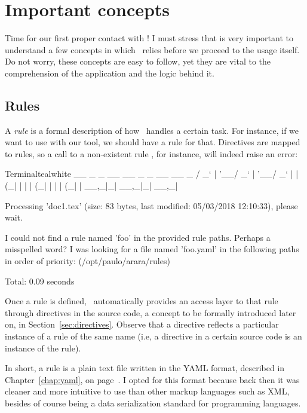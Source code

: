 \chapter{Important concepts}
\label{chap:importantconcepts}

Time for our first proper contact with \arara! I must stress that is very important to understand a few concepts in which \arara\ relies before we proceed to the usage itself. Do not worry, these concepts are easy to follow, yet they are vital to the comprehension of the application and the logic behind it.

\section{Rules}
\label{sec:rule}

A \emph{rule} is a formal description of how \arara\ handles a certain task. For instance, if we want to use  with our tool, we should have a rule for that. Directives are mapped to rules, so a call to a non-existent rule , for instance, will indeed raise an error:

\begin{codebox}{Terminal}{teal}{\icnote}{white}
  __ _ _ __ __ _ _ __ __ _ 
 / _` | '__/ _` | '__/ _` |
| (_| | | | (_| | | | (_| |
 \__,_|_|  \__,_|_|  \__,_|

Processing 'doc1.tex' (size: 83 bytes, last modified: 05/03/2018
12:10:33), please wait.

I could not find a rule named 'foo' in the provided rule paths.
Perhaps a misspelled word? I was looking for a file named
'foo.yaml' in the following paths in order of priority:
(/opt/paulo/arara/rules)

Total: 0.09 seconds
\end{codebox}

Once a rule is defined, \arara\ automatically provides an access layer to that rule through directives in the source code, a concept to be formally introduced later on, in Section~\ref{sec:directives}. Observe that a directive reflects a particular instance of a rule of the same name (i.e, a  directive in a certain source code is an instance of the  rule).

In short, a rule is a plain text file written in the \gls{YAML} format, described in Chapter~\ref{chap:yaml}, on page~\pageref{chap:yaml}. I opted for this format because back then it was cleaner and more intuitive to use than other markup languages such as \gls{XML}, besides of course being a data serialization standard for programming languages.


